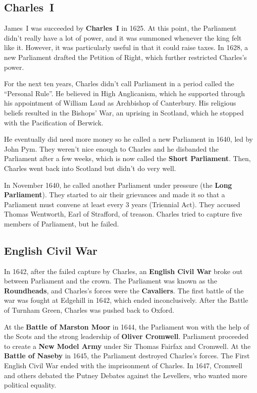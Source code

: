 \subsection*{Charles~I}

James~I was succeeded by \textbf{Charles~I} in 1625.
At this point, the Parliament didn't really have a lot of power,
and it was summoned whenever the king felt like it.
However, it was particularly useful in that it could raise taxes.
In 1628, a new Parliament drafted the Petition of Right, which further restricted Charles's power.

For the next ten years, Charles didn't call Parliament in a period called the ``Personal Rule''.
He believed in High Anglicanism,
which he supported through his appointment of William Laud as Archbishop of Canterbury.
His religious beliefs resulted in the Bishops' War, an uprising in Scotland,
which he stopped with the Pacification of Berwick.

He eventually did need more money so he called a new Parliament in 1640, led by John Pym.
They weren't nice enough to Charles and he disbanded the Parliament after a few weeks,
which is now called the \textbf{Short Parliament}.
Then, Charles went back into Scotland but didn't do very well.

In November 1640, he called another Parliament under pressure (the \textbf{Long Parliament}).
They started to air their grievances
and made it so that a Parliament must convene at least every 3 years (Triennial Act).
They accused Thomas Wentworth, Earl of Strafford, of treason.
Charles tried to capture five members of Parliament, but he failed.

\subsection*{English Civil War}

In 1642, after the failed capture by Charles,
an \textbf{English Civil War} broke out between Parliament and the crown.
The Parliament was known as the \textbf{Roundheads}, and Charles's forces were the \textbf{Cavaliers}.
The first battle of the war was fought at Edgehill in 1642, which ended inconclusively.
After the Battle of Turnham Green, Charles was pushed back to Oxford.

At the \textbf{Battle of Marston Moor} in 1644, the Parliament won with the help of the Scots
and the strong leadership of \textbf{Oliver Cromwell}.
Parliament proceeded to create a \textbf{New Model Army} under Sir Thomas Fairfax and Cromwell.
At the \textbf{Battle of Naseby} in 1645, the Parliament destroyed Charles's forces.
The First English Civil War ended with the imprisonment of Charles.
In 1647, Cromwell and others debated the Putney Debates against the Levellers,
who wanted more political equality.

